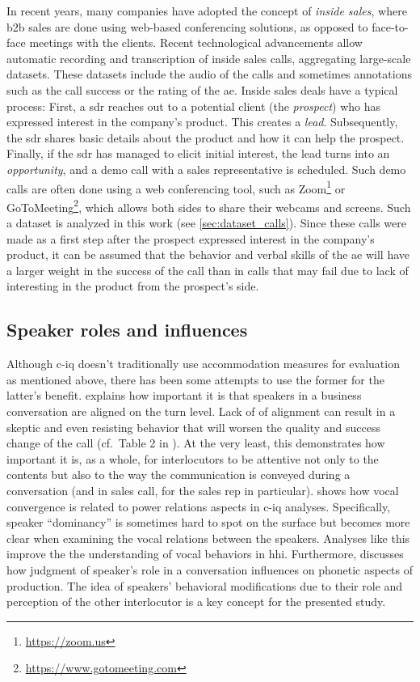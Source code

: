 In recent years, many companies have adopted the concept of \emph{inside sales}, where \ac{b2b} sales are done using web-based conferencing solutions, as opposed to face-to-face meetings with the clients.
Recent technological advancements allow automatic recording and transcription of inside sales calls, aggregating large-scale datasets.
These datasets include the audio of the calls and sometimes annotations such as the call success or the rating of the \ac{ae}.
Inside sales deals have a typical process:
First, a \ac{sdr} reaches out to a potential client (the \emph{prospect}) who has expressed interest in the company's product.
This creates a \emph{lead}.
Subsequently, the \ac{sdr} shares basic details about the product and how it can help the prospect.
Finally, if the \ac{sdr} has managed to elicit initial interest, the lead turns into an \emph{opportunity}, and a demo call with a sales representative is scheduled.
Such demo calls are often done using a web conferencing tool, such as Zoom\footnote{\url{https://zoom.us}} or GoToMeeting\footnote{\url{https://www.gotomeeting.com}}, which allows both sides to share their webcams and screens.
Such a dataset is analyzed in this work (see \cref{sec:dataset_calls}).
Since these calls were made as a first step after the prospect expressed interest in the company's product, it can be assumed that the behavior and verbal skills of the \ac{ae} will have a larger weight in the success of the call than in calls that may fail due to lack of interesting in the product from the prospect's side.

\subsection{Speaker roles and influences}
\label{subsec:speaker_roles_and_influences}

Although \ac{c-iq} doesn't traditionally use accommodation measures for evaluation as mentioned above, there has been some attempts to use the former for the latter's benefit.
\citet{Glaser2016conversational} explains how important it is that speakers in a business conversation are aligned on the turn level.
Lack of of alignment can result in a skeptic and even resisting behavior that will worsen the quality and success change of the call (cf.\ Table 2 in \citet{Glaser2014conversational}).
At the very least, this demonstrates how important it is, as a whole, for interlocutors to be attentive not only to the contents but also to the way the communication is conveyed during a conversation (and in sales call, for the sales rep in particular).
\citet{SilberVarod2018human} shows how vocal convergence is related to power relations aspects in \ac{c-iq} analyses.
Specifically, speaker \enquote{dominancy} is sometimes hard to spot on the surface but becomes more clear when examining the vocal relations between the speakers.
Analyses like this improve the the understanding of vocal behaviors in \ac{hhi}.
Furthermore, \citet{Abrego2011effects} discusses how judgment of speaker's role in a conversation influences on phonetic aspects of production.
The idea of speakers' behavioral modifications due to their role and perception of the other interlocutor is a key concept for the presented study.

